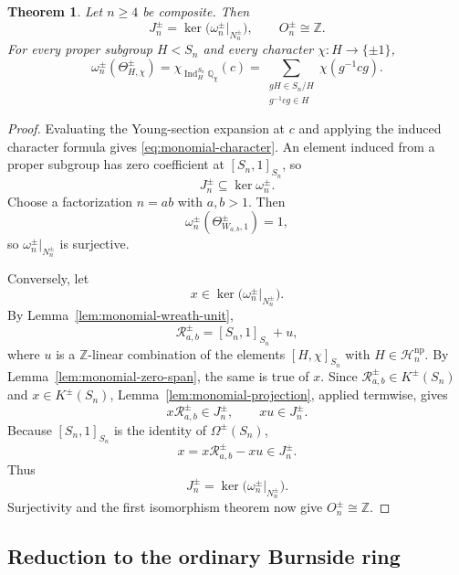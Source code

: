 \documentclass[a4paper,11pt]{article}
\numberwithin{equation}{section}
\newtheorem{theorem}{Theorem}[section]
\newcommand{\Q}{\mathbb{Q}}
\newcommand{\Z}{\mathbb{Z}}
\newcommand{\Ind}{\operatorname{Ind}}
\begin{document}
\begin{theorem}
\label{thm:monomial-main}
Let $n\ge4$ be composite. Then
\[
  J_n^{\pm}
  =
  \ker\bigl(\omega_n^{\pm}|_{N_n^{\pm}}\bigr),
  \qquad
  O_n^{\pm}\cong\Z.
\]
For every proper subgroup $H<S_n$ and every character
$\chi:H\to\{\pm1\}$,
\begin{equation}\label{eq:monomial-character}
  \omega_n^{\pm}(\Theta_{H,\chi}^{\pm})
  =
  \chi_{\Ind_H^{S_n}\Q_\chi}(c)
  =
  \sum_{\substack{gH\in S_n/H\\g^{-1}cg\in H}}
  \chi(g^{-1}cg).
\end{equation}
\end{theorem}

\begin{proof}
Evaluating the Young-section expansion at $c$ and applying the induced
character formula gives \eqref{eq:monomial-character}. An element induced
from a proper subgroup has zero coefficient at $[S_n,1]_{S_n}$, so
\[
  J_n^{\pm}\subseteq\ker\omega_n^{\pm}.
\]
Choose a factorization $n=ab$ with $a,b>1$. Then
\[
  \omega_n^{\pm}(\Theta_{W_{a,b},1}^{\pm})=1,
\]
so $\omega_n^{\pm}|_{N_n^{\pm}}$ is surjective.

Conversely, let
\[
  x\in\ker\bigl(\omega_n^{\pm}|_{N_n^{\pm}}\bigr).
\]
By
Lemma~\ref{lem:monomial-wreath-unit},
\[
  \mathcal R_{a,b}^{\pm}
  =
  [S_n,1]_{S_n}+u,
\]
where $u$ is a $\Z$-linear combination of the elements $[H,\chi]_{S_n}$
with $H\in\mathcal H_n^{\mathrm{np}}$. By
Lemma~\ref{lem:monomial-zero-span}, the same is true of $x$.
Since $\mathcal R_{a,b}^{\pm}\in K^{\pm}(S_n)$ and
$x\in K^{\pm}(S_n)$, Lemma~\ref{lem:monomial-projection}, applied termwise,
gives
\[
  x\mathcal R_{a,b}^{\pm}\in J_n^{\pm},
  \qquad
  xu\in J_n^{\pm}.
\]
Because $[S_n,1]_{S_n}$ is the identity of $\Omega^{\pm}(S_n)$,
\[
  x
  =
  x\mathcal R_{a,b}^{\pm}-xu
  \in J_n^{\pm}.
\]
Thus
\[
  J_n^{\pm}
  =
  \ker\bigl(\omega_n^{\pm}|_{N_n^{\pm}}\bigr).
\]
Surjectivity and the first isomorphism theorem now give
$O_n^{\pm}\cong\Z$.
\end{proof}

\subsection{Reduction to the ordinary Burnside ring}
\end{document}

